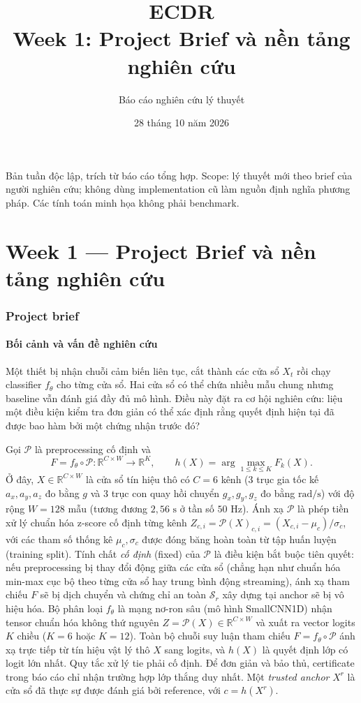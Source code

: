 \documentclass[11pt,a4paper]{article}
\newcommand{\R}{\mathbb R}
\newcommand{\Sset}{\mathcal S}
\theoremstyle{remark}
\begin{document}
\title{\textcolor{ink}{ECDR}\\[5pt]\Large Week 1: Project Brief và nền tảng nghiên cứu}
\author{Báo cáo nghiên cứu lý thuyết}
\date{28 tháng 10 năm 2026}
\maketitle
\noindent Bản tuần độc lập, trích từ báo cáo tổng hợp. Scope: lý thuyết mới
theo brief của người nghiên cứu; không dùng implementation cũ làm nguồn
định nghĩa phương pháp. Các tính toán minh họa không phải benchmark.
\tableofcontents
\clearpage
\part{Week 1 --- Project Brief và nền tảng nghiên cứu}
\section{Project brief}
\subsection{Bối cảnh và vấn đề nghiên cứu}
Một thiết bị nhận chuỗi cảm biến liên tục, cắt thành các cửa sổ $X_t$ rồi
chạy classifier $f_\theta$ cho từng cửa sổ. Hai cửa sổ có thể chứa nhiều mẫu
chung nhưng baseline vẫn đánh giá đầy đủ mô hình. Điều này đặt ra cơ hội
nghiên cứu: liệu một điều kiện kiểm tra đơn giản có thể xác định rằng quyết
định hiện tại đã được bao hàm bởi một chứng nhận trước đó?

Gọi $\mathcal P$ là preprocessing cố định và
\begin{equation}
 F=f_\theta\circ\mathcal P:\R^{C\times W}\longrightarrow\R^K,
 \qquad h(X)=\arg\max_{1\le k\le K}F_k(X).
 \label{eq:reference}
\end{equation}
Ở đây, $X\in\R^{C\times W}$ là cửa sổ tín hiệu thô có $C=6$ kênh (3 trục gia tốc kế $a_x,a_y,a_z$ đo bằng $g$ và 3 trục con quay hồi chuyển $g_x,g_y,g_z$ đo bằng $\text{rad/s}$) với độ rộng $W=128$ mẫu (tương đương $2{,}56\text{ s}$ ở tần số $50\text{ Hz}$). Ánh xạ $\mathcal P$ là phép tiền xử lý chuẩn hóa z-score cố định từng kênh $Z_{c,i}=\mathcal P(X)_{c,i}=(X_{c,i}-\mu_c)/\sigma_c$, với các tham số thống kê $\mu_c,\sigma_c$ được đóng băng hoàn toàn từ tập huấn luyện (training split). Tính chất \emph{cố định} (fixed) của $\mathcal P$ là điều kiện bắt buộc tiên quyết: nếu preprocessing bị thay đổi động giữa các cửa sổ (chẳng hạn như chuẩn hóa min-max cục bộ theo từng cửa sổ hay trung bình động streaming), ánh xạ tham chiếu $F$ sẽ bị dịch chuyển và chứng chỉ an toàn $\Sset_r$ xây dựng tại anchor sẽ bị vô hiệu hóa. Bộ phân loại $f_\theta$ là mạng nơ-ron sâu (mô hình SmallCNN1D) nhận tensor chuẩn hóa không thứ nguyên $Z=\mathcal P(X)\in\R^{C\times W}$ và xuất ra vector logits $K$ chiều ($K=6$ hoặc $K=12$). Toàn bộ chuỗi suy luận tham chiếu $F=f_\theta\circ\mathcal P$ ánh xạ trực tiếp từ tín hiệu vật lý thô $X$ sang logits, và $h(X)$ là quyết định lớp có logit lớn nhất. Quy tắc xử lý tie
phải cố định. Để đơn giản và bảo thủ, certificate trong báo cáo chỉ nhận
trường hợp lớp thắng duy nhất. Một \emph{trusted anchor} $X^r$ là cửa sổ đã
thực sự được đánh giá bởi reference, với $c=h(X^r)$.
\end{document}
